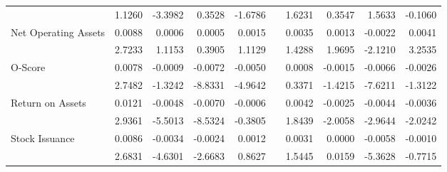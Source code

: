 \begin{table}[]
\begin{tabular}{@{}lrrrrlrrrr@{}}
        & 1.1260 & -3.3982 & 0.3528 & -1.6786 &  & 1.6231 & 0.3547 & 1.5633 & -0.1060 \\
    Net Operating Assets & 0.0088 & 0.0006 & 0.0005 & 0.0015 &  & 0.0035 & 0.0013 & -0.0022 & 0.0041 \\
        & 2.7233 & 1.1153 & 0.3905 & 1.1129 &  & 1.4288 & 1.9695 & -2.1210 & 3.2535 \\
    O-Score & 0.0078 & -0.0009 & -0.0072 & -0.0050 &  & 0.0008 & -0.0015 & -0.0066 & -0.0026 \\
        & 2.7482 & -1.3242 & -8.8331 & -4.9642 &  & 0.3371 & -1.4215 & -7.6211 & -1.3122 \\
    Return on Assets & 0.0121 & -0.0048 & -0.0070 & -0.0006 &  & 0.0042 & -0.0025 & -0.0044 & -0.0036 \\
        & 2.9361 & -5.5013 & -8.5324 & -0.3805 &  & 1.8439 & -2.0058 & -2.9644 & -2.0242 \\
    Stock Issuance & 0.0086 & -0.0034 & -0.0024 & 0.0012 &  & 0.0031 & 0.0000 & -0.0058 & -0.0010 \\
        & 2.6831 & -4.6301 & -2.6683 & 0.8627 &  & 1.5445 & 0.0159 & -5.3628 & -0.7715 \\ \bottomrule
    \end{tabular}
\end{table}
  
